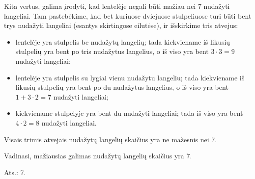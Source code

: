 \documentclass[11pt,a4paper]{article}
\begin{document}
\begin{center}
\end{center}

Kita vertus, galima įrodyti, kad lentelėje negali būti mažiau nei 7 nudažyti langeliai. Tam pastebėkime, kad bet kuriuose dviejuose stulpeliuose turi būti bent trys nudažyti langeliai (esantys skirtingose eilutėse), ir išskirkime tris atvejus:
\begin{itemize}
\item[1)] lentelėje yra stulpelis be nudažytų langelių; tada kiekviename iš likusių stulpelių yra bent po tris nudažytus langelius, o iš viso yra bent $3\cdot3=9$ nudažyti langeliai; 
\item[2)] lentelėje yra stulpelis su lygiai vienu nudažytu langeliu; tada kiekviename iš likusių stulpelių yra bent po du nudažytus langelius, o iš viso yra bent $1+3\cdot2=7$ nudažyti langeliai;
\item[3)] kiekviename stulpelyje yra bent du nudažyti langeliai; tada iš viso yra bent $4\cdot2=8$ nudažyti langeliai.
\end{itemize}
Visais trimis atvejais nudažytų langelių skaičius yra ne mažesnis nei 7. 

Vadinasi, mažiausias galimas nudažytų langelių skaičius yra 7. 


\begin{flushright}
Ats.: 7.
\end{flushright}
 \vspace{0,7cm}  
\end{document}
